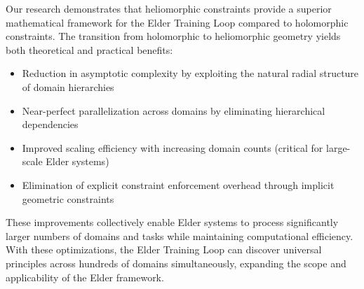 Our research demonstrates that heliomorphic constraints provide a superior mathematical framework for the Elder Training Loop compared to holomorphic constraints. The transition from holomorphic to heliomorphic geometry yields both theoretical and practical benefits:

\begin{itemize}
    \item Reduction in asymptotic complexity by exploiting the natural radial structure of domain hierarchies
    \item Near-perfect parallelization across domains by eliminating hierarchical dependencies
    \item Improved scaling efficiency with increasing domain counts (critical for large-scale Elder systems)
    \item Elimination of explicit constraint enforcement overhead through implicit geometric constraints
\end{itemize}

These improvements collectively enable Elder systems to process significantly larger numbers of domains and tasks while maintaining computational efficiency. With these optimizations, the Elder Training Loop can discover universal principles across hundreds of domains simultaneously, expanding the scope and applicability of the Elder framework.